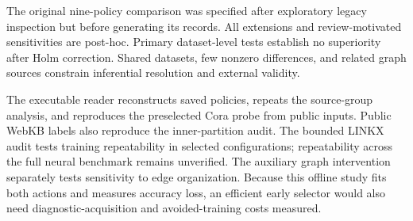 The original nine-policy comparison was specified after exploratory legacy inspection but before generating its records. All extensions and review-motivated sensitivities are post-hoc. Primary dataset-level tests establish no superiority after Holm correction. Shared datasets, few nonzero differences, and related graph sources constrain inferential resolution and external validity.

The executable reader reconstructs saved policies, repeats the source-group analysis, and reproduces the preselected Cora probe from public inputs. Public WebKB labels also reproduce the inner-partition audit. The bounded LINKX audit tests training repeatability in selected configurations; repeatability across the full neural benchmark remains unverified. The auxiliary graph intervention separately tests sensitivity to edge organization. Because this offline study fits both actions and measures accuracy loss, an efficient early selector would also need diagnostic-acquisition and avoided-training costs measured.
